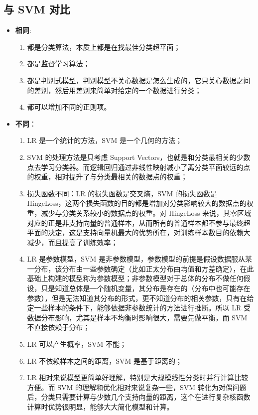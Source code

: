 \documentclass[12pt]{article}
\numberwithin{theorem}{section} %
\numberwithin{definition}{section} %
\numberwithin{assumption}{section} %
\numberwithin{lemma}{section} %
\numberwithin{remark}{section} %
\numberwithin{prop}{section} %
\numberwithin{corollary}{section} %
\numberwithin{example}{section} %
\numberwithin{question}{section} %
\numberwithin{problem}{section} %
\numberwithin{conjecture}{section} %
\numberwithin{append}{section} %
\numberwithin{property}{section} %
\begin{document}
\begin{CJK}{UTF8}{gbsn}
		
		
		
	
	
	\subsection{与 SVM 对比}
	\begin{itemize}
		\item \textbf{相同}:
		\begin{enumerate}
			\item 都是分类算法，本质上都是在找最佳分类超平面；
			\item 都是监督学习算法；
			\item 都是判别式模型，判别模型不关心数据是怎么生成的，它只关心数据之间的差别，然后用差别来简单对给定的一个数据进行分类；
			\item 都可以增加不同的正则项。
		\end{enumerate}
		\item \textbf{不同}：
		\begin{enumerate}
			\item LR 是一个统计的方法，SVM 是一个几何的方法；
			\item SVM 的处理方法是只考虑 Support Vectors，也就是和分类最相关的少数点去学习分类器。而逻辑回归通过非线性映射减小了离分类平面较远的点的权重，相对提升了与分类最相关的数据点的权重；
			\item 损失函数不同：LR 的损失函数是交叉熵，SVM 的损失函数是 HingeLoss，这两个损失函数的目的都是增加对分类影响较大的数据点的权重，减少与分类关系较小的数据点的权重。对 HingeLoss 来说，其零区域对应的正是非支持向量的普通样本，从而所有的普通样本都不参与最终超平面的决定，这是支持向量机最大的优势所在，对训练样本数目的依赖大减少，而且提高了训练效率；
			\item LR 是参数模型，SVM 是非参数模型，参数模型的前提是假设数据服从某一分布，该分布由一些参数确定（比如正太分布由均值和方差确定），在此基础上构建的模型称为参数模型；非参数模型对于总体的分布不做任何假设，只是知道总体是一个随机变量，其分布是存在的（分布中也可能存在参数），但是无法知道其分布的形式，更不知道分布的相关参数，只有在给定一些样本的条件下，能够依据非参数统计的方法进行推断。所以 LR 受数据分布影响，尤其是样本不均衡时影响很大，需要先做平衡，而 SVM 不直接依赖于分布；
			\item LR 可以产生概率，SVM 不能；
			\item LR 不依赖样本之间的距离，SVM 是基于距离的；
			\item LR 相对来说模型更简单好理解，特别是大规模线性分类时并行计算比较方便。而 SVM 的理解和优化相对来说复杂一些，SVM 转化为对偶问题后，分类只需要计算与少数几个支持向量的距离，这个在进行复杂核函数计算时优势很明显，能够大大简化模型和计算。
		\end{enumerate}
	\end{itemize}
	

\end{CJK}
\end{document}

